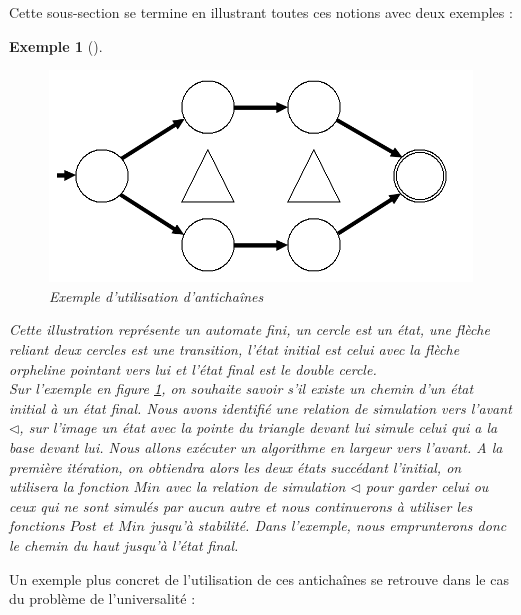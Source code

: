 \documentclass[12pt,a4paper,oneside]{book}
\theoremstyle{break}
\newtheorem{exem}{Exemple}[chapter]
\theoremstyle{breakplain}
\begin{document}
Cette sous-section se termine en illustrant toutes ces notions avec deux exemples :

\begin{exem}[]
\begin{figure}[!h]
\includegraphics[width=\textwidth]{images/exanti2.png}
\caption{Exemple d'utilisation d'antichaînes}
\label{dfna}
\end{figure}

Cette illustration représente un automate fini, un cercle est un état, une flèche reliant deux cercles est une transition, l'état initial est celui avec la flèche orpheline pointant vers lui et l'état final est le double cercle.\\

Sur l'exemple en figure \ref{dfna}, on souhaite savoir s'il existe un chemin d'un état initial à un état final. Nous avons identifié une relation de simulation vers l'avant $\triangleleft$, sur l'image un état avec la pointe du triangle devant lui simule celui qui a la base devant lui. Nous allons exécuter un algorithme en largeur vers l'avant. A la première itération, on obtiendra alors les deux états succédant l'initial, on utilisera la fonction $Min$ avec la relation de simulation $\triangleleft$ pour garder celui ou ceux qui ne sont simulés par aucun autre et nous continuerons à utiliser les fonctions $Post$ et $Min$ jusqu'à stabilité. Dans l'exemple, nous emprunterons donc le chemin du haut jusqu'à l'état final.

\end{exem}

Un exemple plus concret de l'utilisation de ces antichaînes se retrouve dans le cas du problème de l'universalité :
\end{document}
